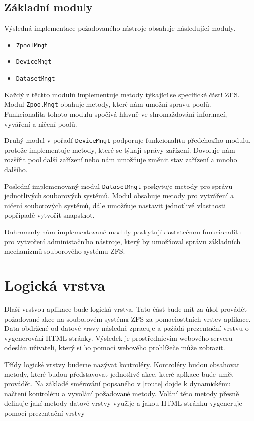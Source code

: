     \subsection{Základní moduly}
    Výsledná implementace požadovaného nástroje obsahuje následující moduly.
    \begin{itemize}
      \item \verb|ZpoolMngt|
      \item \verb|DeviceMngt|
      \item \verb|DatasetMngt|
    \end{itemize}

    Každý z těchto modulů implementuje metody týkající se specifické části ZFS. Modul \verb|ZpoolMngt| obahuje metody, které nám umožní spravu poolů. Funkcionalita tohoto modulu spočívá hlavně ve shromaždování informací, vyváření a ničení poolů.

    Druhý modul v pořadí \verb|DeviceMngt| podporuje funkcionalitu předchozího modulu, protože implementuje metody, které se týkají správy zařízení. Dovoluje nám rozšířit pool další zařízení nebo nám umožňuje změnit stav zařízení a mnoho dalšího.

    Poslední implemenovaný modul \verb|DatasetMngt| poskytuje metody pro správu jednotlivých souborových systémů. Modul obsahuje metody pro vytváření a ničení souborových systémů, dále umožňuje nastavit jednotlivé vlastnosti popřípadě vytvořit snapsthot.

    Dohromady nám implementované moduly poskytují dostatečnou funkcionalitu pro vytvoření administačního nástroje, který by umožňoval správu základních mechanizmů souborového systému ZFS.
\section{Logická vrstva}
Dlaší vrstvou aplikace bude logická vrstva. Tato část bude mít za úkol provádět požadované akce na souborovém systému ZFS za pomociosttních vrstev aplikace. Data obdržené od datové vrsvy následně zpracuje a požádá prezentační vrstvu o vygenerování HTML stránky. Výsledek je prostřednicvím webového serveru odeslán uživateli, který si ho pomocí webového prohlížeče může zobrazit.

Třídy logické vrstvy budeme nazývat kontroléry. Kontroléry budou obsahovat metody, které budou představovat jednotlivé akce, které aplkace bude umět provádět. Na základě směrování popsaného v \ref{route} dojde k dynamickému načtení kontroléru a vyvolání požadované metody. Volání této metody přesně definuje jaké metody datové vrstvy využije a jakou HTML stránku vygeneruje pomocí prezentační vrstvy.
